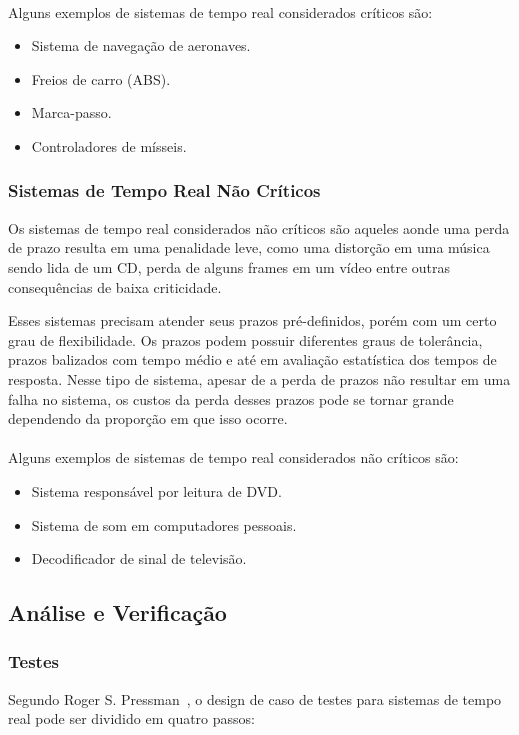 \paragraph{}
Alguns exemplos de sistemas de tempo real considerados críticos são:
\begin{itemize}
\item Sistema de navegação de aeronaves.
\item Freios de carro (ABS).
\item Marca-passo.
\item Controladores de mísseis.
\end{itemize}

\subsubsection{Sistemas de Tempo Real Não Críticos}
Os sistemas de tempo real considerados não críticos são aqueles aonde uma perda de prazo
resulta em uma penalidade leve, como uma distorção em uma música sendo lida de um CD, perda
de alguns frames em um vídeo entre outras consequências de baixa criticidade.

Esses sistemas precisam atender seus prazos pré-definidos, porém com um certo grau de flexibilidade.
Os prazos podem possuir diferentes graus de tolerância, prazos balizados com tempo médio e até em avaliação
estatística dos tempos de resposta. Nesse tipo de sistema, apesar de a perda de prazos não resultar em uma
falha no sistema, os custos da perda desses prazos pode se tornar grande dependendo da proporção em que isso
ocorre.~\cite{Li:2003:RCE:829584}

\paragraph{}
Alguns exemplos de sistemas de tempo real considerados não críticos são:
\begin{itemize}
\item Sistema responsável por leitura de DVD.
\item Sistema de som em computadores pessoais.
\item Decodificador de sinal de televisão.
\end{itemize}

\subsection{Análise e Verificação}
\subsubsection{Testes}
Segundo Roger S. Pressman~\cite{pre_2005}, o design de caso de testes para sistemas de tempo real pode ser dividido
em quatro passos:

